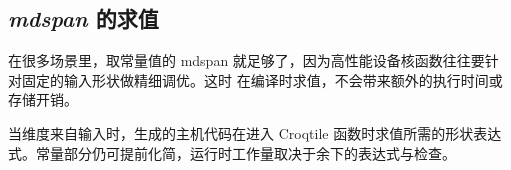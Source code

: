\subsection*{\emph{mdspan} 的求值}

在很多场景里，取常量值的 mdspan 就足够了，因为高性能设备核函数往往要针对固定的输入形状做精细调优。这时 \co@mdspan@ 在编译时求值，不会带来额外的执行时间或存储开销。

当维度来自输入时，生成的主机代码在进入 Croqtile 函数时求值所需的形状表达式。常量部分仍可提前化简，运行时工作量取决于余下的表达式与检查。
